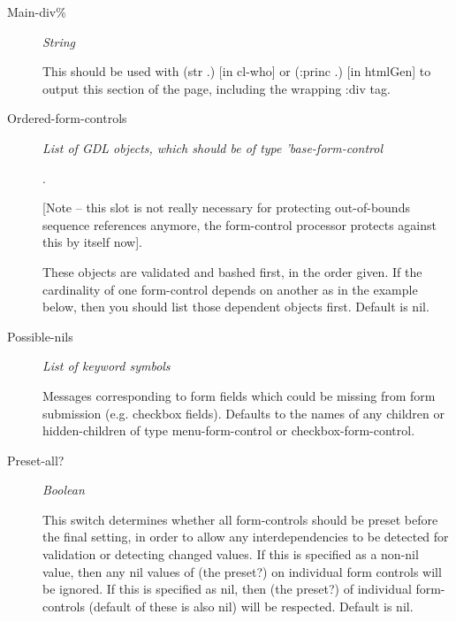 \documentclass [11pt]{book}
\begin{document}
\begin{itemize}
\begin{description}
\item [Main-div\%]
\emph{String}

 This should be used with (str .) [in cl-who] or (:princ .)
[in htmlGen] to output this section of the page, including the wrapping :div tag.




\item [Ordered-form-controls]
\emph{List of GDL objects, which should be of type 'base-form-control}

.



[Note -- this slot is not really necessary for protecting out-of-bounds sequence references
anymore, the form-control processor protects against this by itself now].



These objects are validated and bashed first, in the order given. If the cardinality
of one form-control depends on another as in the example below, then you should list
those dependent objects first. Default is nil.




\item [Possible-nils]
\emph{List of keyword symbols}

 Messages corresponding to form fields which could
be missing from form submission (e.g. checkbox fields). Defaults to the names
of any children or hidden-children of type  menu-form-control or
checkbox-form-control.




\item [Preset-all?]
\emph{Boolean}

 This switch determines whether all form-controls should be preset
before the final setting, in order to allow any interdependencies to be detected
for validation or detecting changed values. If this is specified as a non-nil
value, then any nil values of (the preset?) on individual form controls will be
ignored. If this is specified as nil, then (the preset?) of individual
form-controls (default of these is also nil) will be respected. Default is nil.




\end{description}







\end{itemize}
\end{document}
